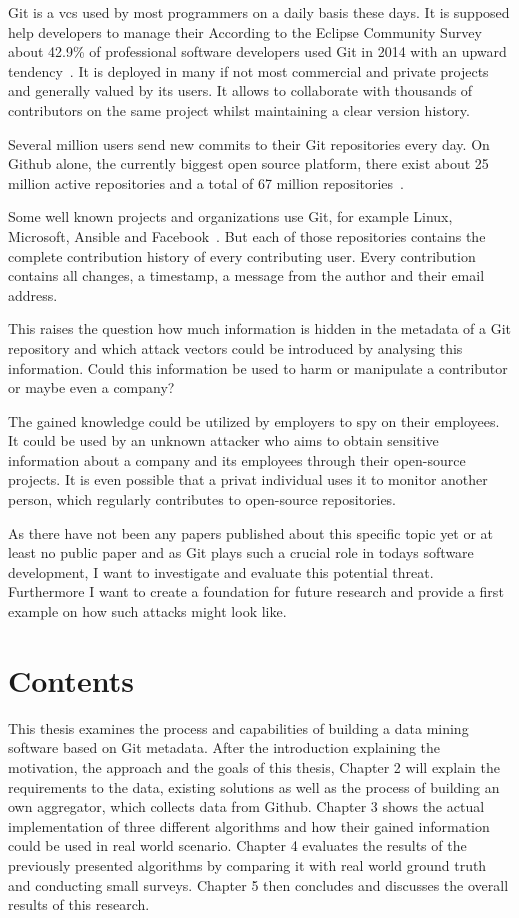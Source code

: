 Git is a \ac{vcs} used by most programmers on a daily basis these days.
It is supposed help developers to manage their
According to the Eclipse Community Survey about 42.9\% of professional software developers used Git in 2014 with an upward tendency~\cite{article:git-popularity}.
It is deployed in many if not most commercial and private projects and generally valued by its users.
It allows to collaborate with thousands of contributors on the same project whilst maintaining a clear version history.

Several million users send new commits to their Git repositories every day.
On Github alone, the currently biggest open source platform, there exist about 25 million active repositories and a total of 67 million repositories~\cite{article:github-statistics}.

Some well known projects and organizations use Git, for example Linux, Microsoft, Ansible and Facebook~\cite{article:github-statistics}.
But each of those repositories contains the complete contribution history of every contributing user.
Every contribution contains all changes, a timestamp, a message from the author and their email address.

This raises the question how much information is hidden in the metadata of a Git repository and which attack vectors could be introduced by analysing this information.
Could this information be used to harm or manipulate a contributor or maybe even a company?

The gained knowledge could be utilized by employers to spy on their employees.
It could be used by an unknown attacker who aims to obtain sensitive information about a company and its employees through their open-source projects.
It is even possible that a privat individual uses it to monitor another person, which regularly contributes to open-source repositories.

As there have not been any papers published about this specific topic yet or at least no public paper and as Git plays such a crucial role in todays software development, I want to investigate and evaluate this potential threat.
Furthermore I want to create a foundation for future research and provide a first example on how such attacks might look like.

\section{Contents}
This thesis examines the process and capabilities of building a data mining software based on Git metadata.
After the introduction explaining the motivation, the approach and the goals of this thesis, Chapter 2 will explain the requirements to the data, existing solutions as well as the process of building an own aggregator, which collects data from Github.
Chapter 3 shows the actual implementation of three different algorithms and how their gained information could be used in real world scenario.
Chapter 4 evaluates the results of the previously presented algorithms by comparing it with real world ground truth and conducting small surveys.
Chapter 5 then concludes and discusses the overall results of this research.

